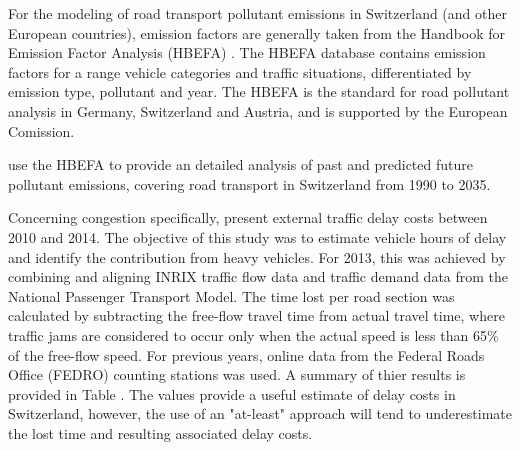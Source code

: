 For the modeling of road transport pollutant emissions in Switzerland (and other European countries), emission factors are generally taken from the Handbook for Emission Factor Analysis (HBEFA) \cite{maibach2008emissions}.
The HBEFA database contains emission factors for a range vehicle categories and traffic situations, differentiated by emission type, pollutant and year. The HBEFA is the standard for road pollutant analysis in Germany, Switzerland and Austria, and is supported by the European Comission. 

\citet{foen2010pollutants} use the HBEFA to provide an detailed analysis of past and predicted future pollutant emissions, covering road transport in Switzerland from 1990 to 2035.

Concerning congestion specifically, \cite{mkinfras2016staukosten} present external traffic delay costs between 2010 and 2014.
The objective of this study was to estimate vehicle hours of delay and identify the contribution from heavy vehicles.
For 2013, this was achieved by combining and aligning INRIX traffic flow data and traffic demand data from the National Passenger Transport Model.
The time lost per road section was calculated by subtracting the free-flow travel time from actual travel time, where traffic jams are considered to occur only when the actual speed is less than 65\% of the free-flow speed.
For previous years, online data from the Federal Roads Office (FEDRO) counting stations was used.
A summary of thier results is provided in Table .
The values provide a useful estimate of delay costs in Switzerland, however, the use of an "at-least" approach will tend to underestimate the lost time and resulting associated delay costs. 

